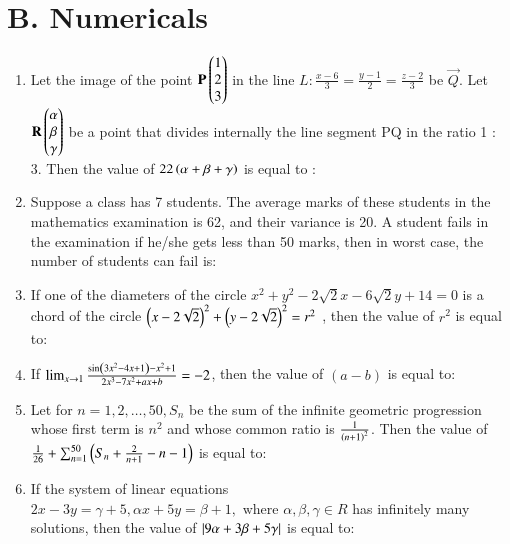 \documentclass[journal]{IEEEtran}
\theoremstyle{remark}
\begin{document}
\section*{B. Numericals}
\begin{enumerate}

\item  Let the image of the point $\mathbf{P}\begin{pmatrix}1\\ 2\\ 3\end{pmatrix}$ in the line $L: \frac{x - 6}{3} = \frac{y - 1}{2} = \frac{z - 2}{3}$ be $\vec{Q}$. Let $\mathbf{R} \begin{pmatrix}\alpha \\ \beta \\ \gamma\end{pmatrix}$ be a point that divides internally the line segment PQ in the ratio 1 : 3. Then the value of $22\left(\alpha + \beta + \gamma\right)$ is equal to :\\


\item Suppose a class has 7 students. The average marks of these students in the mathematics examination is 62, and their variance is 20. A student fails in the examination if he/she gets less than 50 marks, then in worst case, the number of students can fail is:\\


\item If one of the diameters of the circle $x^2 + y^2 - 2\sqrt{2}x - 6\sqrt{2}y + 14 = 0$ is a chord of the circle
${\left( x - 2\sqrt{2} \right)}^2 + {\left( y - 2\sqrt{2} \right)}^2 = r^2$ , then the value of $r^2$ is equal to:\\

\item If $\lim_{x \to 1} \frac{\sin\left(3x^2 - 4x + 1\right) - x^2 + 1}{2x^3 - 7x^2 + ax + b} = -2$, then the value of $(a - b)$ is equal to:\\

\item Let for $n = 1, 2,\dots, 50, S_n$ be the sum of the infinite geometric progression whose first term is $n^2$ and whose common ratio is $\frac{1}{\left(n + 1\right)^2}$. Then the value of $\frac{1}{26} + \sum_{n=1}^{50} \left( S_n + \frac{2}{n + 1} - n - 1\right) $ is equal to:\\


\item If the system of linear equations $2x - 3y = \gamma + 5, \alpha x + 5y = \beta + 1, \text{ where } \alpha, \beta, \gamma \in R$ has infinitely many solutions, then the value of $\left\vert9\alpha + 3\beta + 5\gamma\right\vert$ is equal to:\\


\end{enumerate}
\end{document}
